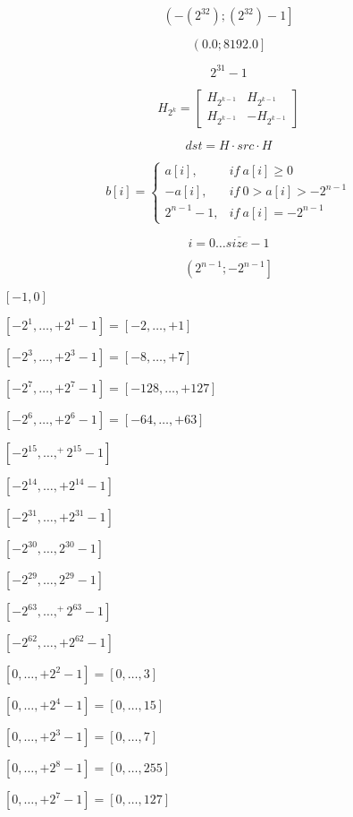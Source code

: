 \documentclass{article}
\begin{document}
\[
    \left( -(2^32); (2^32) - 1\right]
\]
\pagebreak

\[
    \left( 0.0; 8192.0\right]
\]
\pagebreak

\[
    2^31 - 1
\]
\pagebreak

\[
    H_{2^{k}} =\begin{bmatrix}
    H_{2^{k-1}} & H_{2^{k-1}}\\
    H_{2^{k-1}} & -H_{2^{k-1}}
    \end{bmatrix}
\]
\pagebreak

\[
    dst=H\cdotp src\cdotp H
\]
\pagebreak

\[
    b[ i] =\begin{cases}
        a[ i] , & if\ a[ i] \geq 0\\
        -a[ i] , & if\ 0 >a[ i]  >-2^{n-1}\\
        2^{n-1} -1, & if\ a[ i] =-2^{n-1}
    \end{cases}
\]
\pagebreak

\[ i = \overline{0 \ldots size-1} \]
\pagebreak

\[
    \left( 2^{n-1} ;-2^{n-1}\right]
\]
\pagebreak

$[-1,0]$
\pagebreak

$[-2^1,\ldots,+2^1-1]=[-2,\ldots,+1]$
\pagebreak

$[-2^3,\ldots,+2^3-1]=[-8,\ldots,+7]$
\pagebreak

$[-2^7,\ldots,+2^7-1]=[-128,\ldots,+127]$
\pagebreak

$[-2^6,\ldots,+2^6-1]=[-64,\ldots,+63]$
\pagebreak

$[-2^{15},\ldots,^+2^{15}-1]$
\pagebreak

$[-2^{14},\ldots,+2^{14}-1]$
\pagebreak

$[-2^{31},\ldots,+2^{31}-1]$
\pagebreak

$[-2^{30},\ldots,2^{30}-1]$
\pagebreak

$[-2^{29},\ldots,2^{29}-1]$
\pagebreak

$[-2^{63},\ldots,^+2^{63}-1]$
\pagebreak

$[-2^{62},\ldots,+2^{62}-1]$
\pagebreak

$[0,\ldots,+2^2-1]=[0,\ldots,3]$
\pagebreak

$[0,\ldots,+2^4-1]=[0,\ldots,15]$
\pagebreak

$[0,\ldots,+2^3-1]=[0,\ldots,7]$
\pagebreak

$[0,\ldots,+2^8-1]=[0,\ldots,255]$
\pagebreak

$[0,\ldots,+2^7-1]=[0,\ldots,127]$
\pagebreak
\end{document}
